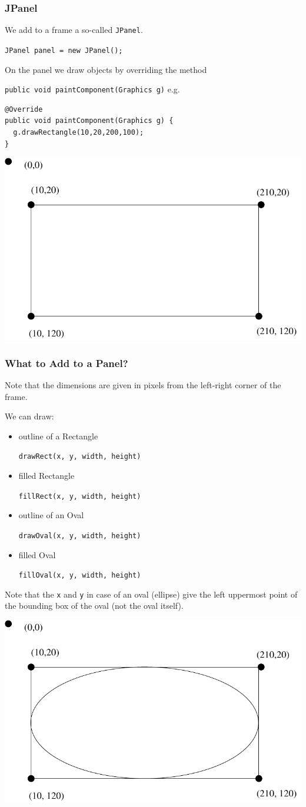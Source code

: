 \documentclass{beamer}
\def\mcolor#1#2{\rule{0ex}{0ex}\color{#1}#2\color{black}{}}
\begin{document}
\begin{frame}[fragile]
\frametitle{JPanel}

We add to a frame a so-called \texttt{JPanel}.

\mcolor{blue}{\texttt{JPanel panel = new JPanel();}}

On the panel we draw objects by overriding the method\\
\mcolor{blue}{\texttt{public void paintComponent(Graphics g)}}
e.g.
\begin{verbatim}
@Override
public void paintComponent(Graphics g) {
  g.drawRectangle(10,20,200,100);
}
\end{verbatim}
\begin{center}
\includegraphics[width=.5\textwidth]{./rec1.pdf}
\end{center}
\end{frame}

\begin{frame}[fragile]
\frametitle{What to Add to a Panel?}

  Note that the dimensions are given in pixels from the left-right
  corner of the frame.

We can draw:

\begin{itemize}
\item outline of a Rectangle \mcolor{blue}{\texttt{drawRect(x, y, width, height)}}
\item filled Rectangle \mcolor{blue}{\texttt{fillRect(x, y, width, height)}}
\item outline of an Oval \mcolor{blue}{\texttt{drawOval(x, y, width, height)}}
\item filled Oval \mcolor{blue}{\texttt{fillOval(x, y, width, height)}}
\end{itemize}

Note that the \texttt{x} and \texttt{y} in case of an oval (ellipse)
give the left uppermost point of the bounding box of the oval (not the
oval itself).\vspace{-0.7cm}

\begin{center}
\includegraphics[width=.5\textwidth]{./oval1.pdf}
\end{center}

\end{frame}
\end{document}
